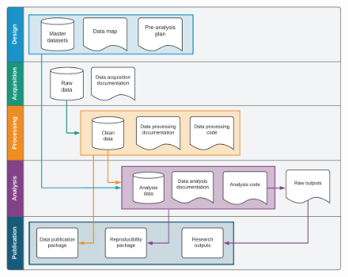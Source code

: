 \vspace{1cm}
\begin{fullwidth}
	\begin{figure}
		\centering
		\includegraphics[width=1.6\linewidth]{diagrams/Conclusion}
		\caption{}
		\label{fig:intro}
	\end{figure}
\end{fullwidth}
